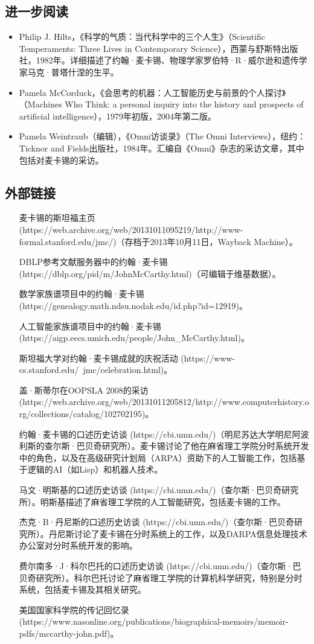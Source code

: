 \subsection{进一步阅读}
\begin{itemize}
\item Philip J. Hilts，《科学的气质：当代科学中的三个人生》（Scientific Temperaments: Three Lives in Contemporary Science），西蒙与舒斯特出版社，1982年。详细描述了约翰·麦卡锡、物理学家罗伯特·R·威尔逊和遗传学家马克·普塔什涅的生平。
\item Pamela McCorduck，《会思考的机器：人工智能历史与前景的个人探讨》（Machines Who Think: a personal inquiry into the history and prospects of artificial intelligence），1979年初版，2004年第二版。
\item Pamela Weintraub（编辑），《Omni访谈录》（The Omni Interviews），纽约：Ticknor and Fields出版社，1984年。汇编自《Omni》杂志的采访文章，其中包括对麦卡锡的采访。
\end{itemize}
\subsection{外部链接}
\begin{itemize}
\item [麦卡锡的斯坦福主页](https://web.archive.org/web/20131011095219/http://www-formal.stanford.edu/jmc/)（存档于2013年10月11日，Wayback Machine）。
\item [DBLP参考文献服务器中的约翰·麦卡锡](https://dblp.org/pid/m/JohnMcCarthy.html)（可编辑于维基数据）。
\item [数学家族谱项目中的约翰·麦卡锡](https://genealogy.math.ndsu.nodak.edu/id.php?id=12919)。
\item [人工智能家族谱项目中的约翰·麦卡锡](https://aigp.eecs.umich.edu/people/John_McCarthy.html)。
\item [斯坦福大学对约翰·麦卡锡成就的庆祝活动](https://www-cs.stanford.edu/~jmc/celebration.html)。
\item [盖·斯蒂尔在OOPSLA 2008的采访](https://web.archive.org/web/20131011205812/http://www.computerhistory.org/collections/catalog/102702195)。
\item [约翰·麦卡锡的口述历史访谈](https://cbi.umn.edu/)（明尼苏达大学明尼阿波利斯的查尔斯·巴贝奇研究所）。麦卡锡讨论了他在麻省理工学院分时系统开发中的角色，以及在高级研究计划局（ARPA）资助下的人工智能工作，包括基于逻辑的AI（如Lisp）和机器人技术。
\item [马文·明斯基的口述历史访谈](https://cbi.umn.edu/)（查尔斯·巴贝奇研究所）。明斯基描述了麻省理工学院的人工智能研究，包括麦卡锡的工作。
\item [杰克·B·丹尼斯的口述历史访谈](https://cbi.umn.edu/)（查尔斯·巴贝奇研究所）。丹尼斯讨论了麦卡锡在分时系统上的工作，以及DARPA信息处理技术办公室对分时系统开发的影响。
\item [费尔南多·J·科尔巴托的口述历史访谈](https://cbi.umn.edu/)（查尔斯·巴贝奇研究所）。科尔巴托讨论了麻省理工学院的计算机科学研究，特别是分时系统，包括麦卡锡及其相关研究。
\item [美国国家科学院的传记回忆录](https://www.nasonline.org/publications/biographical-memoirs/memoir-pdfs/mccarthy-john.pdf)。
\end{itemize}